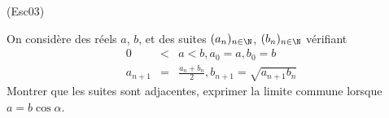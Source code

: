 \begin{tiny}(Esc03)\end{tiny} On consid{\`e}re des r{\'e}els $a$, $b$, et des suites $(a_{n})_{n\in
\N}$, $(b_{n})_{n\in \N}$ v{\'e}rifiant
\begin{eqnarray*}
0 &<&a<b,a_{0}=a,b_{0}=b \\
a_{n+1} &=&\frac{a_{n}+b_{n}}{2},b_{n+1}=\sqrt{a_{n+1}b_{n}}
\end{eqnarray*}
Montrer que les suites sont adjacentes, exprimer la limite commune lorsque $%
a=b\cos \alpha $.
